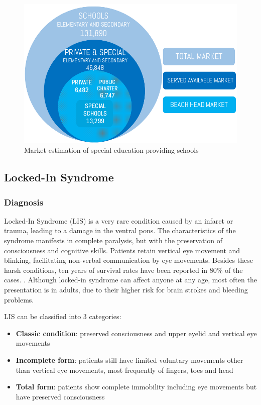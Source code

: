 \documentclass[letterpaper,10pt]{article}
\let\oldsubsection\subsection
\renewcommand{\subsection}{\def\cursectioning{subsection}\oldsubsection}
\begin{document}
\begin{figure}[hbt!]
\centering
\includegraphics[scale=0.5]{charts.png}
\caption{Market estimation of special education providing schools}
\label{img:market_dropdown}
\end{figure}


\subsection{Locked-In Syndrome}
\subsubsection{Diagnosis}

Locked-In Syndrome (LIS) is a very rare condition caused by an infarct or trauma, leading to a damage in the ventral pons. The characteristics of the syndrome manifests in complete paralysis, but with the preservation of consciousness and cognitive skills. Patients retain vertical eye movement and blinking, facilitating non-verbal communication by eye movements. Besides these harsh conditions, ten years of survival rates have been reported in  80\% of the cases. \cite{smith_delargy_2005}. Although locked-in syndrome can affect anyone at any age,  most often the presentation is in adults, due to their higher risk for brain strokes and bleeding problems. \cite{phd}

LIS can be classified into 3 categories:  \cite{orphanet_LIS}
\begin{itemize}
\item \textbf{Classic condition}: preserved consciousness and upper eyelid and vertical eye movements
\item \textbf{Incomplete form}: patients still have limited voluntary movements other than vertical eye movements, most frequently of fingers, toes and head
\item \textbf{Total form}:  patients show complete immobility including eye movements but have preserved consciousness
\end{itemize} 
\end{document}
